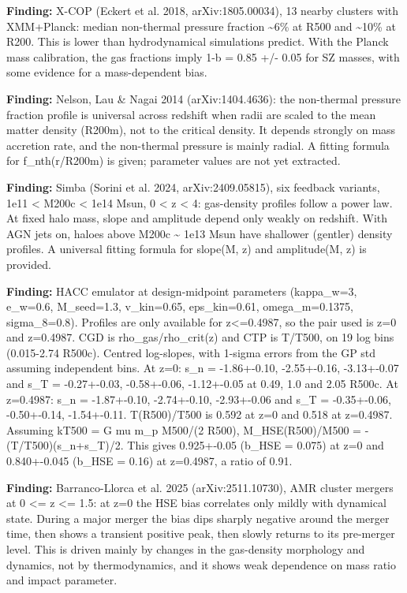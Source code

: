 \documentclass[11pt,a4paper]{article}
\begin{document}
\textbf{Finding:} X-COP (Eckert et al. 2018, arXiv:1805.00034), 13 nearby clusters with XMM+Planck: median non-thermal pressure fraction \textasciitilde{}6\% at R500 and \textasciitilde{}10\% at R200. This is lower than hydrodynamical simulations predict. With the Planck mass calibration, the gas fractions imply 1-b = 0.85 +/- 0.05 for SZ masses, with some evidence for a mass-dependent bias.

\textbf{Finding:} Nelson, Lau \& Nagai 2014 (arXiv:1404.4636): the non-thermal pressure fraction profile is universal across redshift when radii are scaled to the mean matter density (R200m), not to the critical density. It depends strongly on mass accretion rate, and the non-thermal pressure is mainly radial. A fitting formula for f\_nth(r/R200m) is given; parameter values are not yet extracted.

\textbf{Finding:} Simba (Sorini et al. 2024, arXiv:2409.05815), six feedback variants, 1e11 \textless{} M200c \textless{} 1e14 Msun, 0 \textless{} z \textless{} 4: gas-density profiles follow a power law. At fixed halo mass, slope and amplitude depend only weakly on redshift. With AGN jets on, haloes above M200c \textasciitilde{} 1e13 Msun have shallower (gentler) density profiles. A universal fitting formula for slope(M, z) and amplitude(M, z) is provided.

\textbf{Finding:} HACC emulator at design-midpoint parameters (kappa\_w=3, e\_w=0.6, M\_seed=1.3, v\_kin=0.65, eps\_kin=0.61, omega\_m=0.1375, sigma\_8=0.8). Profiles are only available for z\textless{}=0.4987, so the pair used is z=0 and z=0.4987. CGD is rho\_gas/rho\_crit(z) and CTP is T/T500, on 19 log bins (0.015-2.74 R500c). Centred log-slopes, with 1-sigma errors from the GP std assuming independent bins. At z=0: s\_n = -1.86+-0.10, -2.55+-0.16, -3.13+-0.07 and s\_T = -0.27+-0.03, -0.58+-0.06, -1.12+-0.05 at 0.49, 1.0 and 2.05 R500c. At z=0.4987: s\_n = -1.87+-0.10, -2.74+-0.10, -2.93+-0.06 and s\_T = -0.35+-0.06, -0.50+-0.14, -1.54+-0.11. T(R500)/T500 is 0.592 at z=0 and 0.518 at z=0.4987. Assuming kT500 = G mu m\_p M500/(2 R500), M\_HSE(R500)/M500 = -(T/T500)(s\_n+s\_T)/2. This gives 0.925+-0.05 (b\_HSE = 0.075) at z=0 and 0.840+-0.045 (b\_HSE = 0.16) at z=0.4987, a ratio of 0.91.

\textbf{Finding:} Barranco-Llorca et al. 2025 (arXiv:2511.10730), AMR cluster mergers at 0 \textless{}= z \textless{}= 1.5: at z=0 the HSE bias correlates only mildly with dynamical state. During a major merger the bias dips sharply negative around the merger time, then shows a transient positive peak, then slowly returns to its pre-merger level. This is driven mainly by changes in the gas-density morphology and dynamics, not by thermodynamics, and it shows weak dependence on mass ratio and impact parameter.
\end{document}
